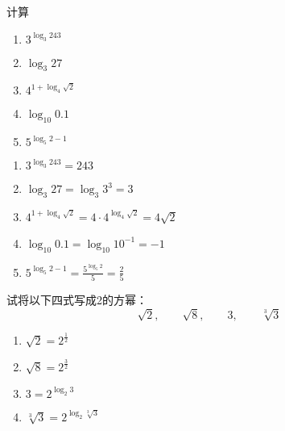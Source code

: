 \begin{example}
计算
\begin{multicols}{3}
\begin{enumerate}
    \item $3^{\log_3 243}$
    \item $\log_3 27$
    \item $4^{1+\log_4\sqrt{2}}$
    \item $\log_{10}0.1$
    \item $5^{\log_5 2 -1}$
\end{enumerate}
\end{multicols}
\end{example}

\begin{solution}
\begin{enumerate}
    \item $3^{\log_3 243}=243$
    \item $\log_3 27=\log_3 3^3=3$
    \item $4^{1+\log_4\sqrt{2}}=4\cdot 4^{\log_4\sqrt{2}}=4\sqrt{2}$
    \item $\log_{10}0.1=\log_{10}10^{-1}=-1$
    \item $5^{\log_5 2 -1}=\frac{5^{\log_5 2}}{5}=\frac{2}{5}$
\end{enumerate}    
\end{solution}

\begin{example}
 试将以下四式写成2的方幂：
 \[\sqrt{2},\qquad \sqrt{8},\qquad 3,\qquad \sqrt[3]{3}\]   
\end{example}
  
\begin{solution}
\begin{enumerate}
    \item $\sqrt{2}=2^{\tfrac{1}{2}}$
    \item $\sqrt{8}=2^{\tfrac{3}{2}}$
    \item $3=2^{\log_2 3}$
    \item $\sqrt[3]{3}=2^{\log_2 \sqrt[3]{3}}$
\end{enumerate}
\end{solution} 


